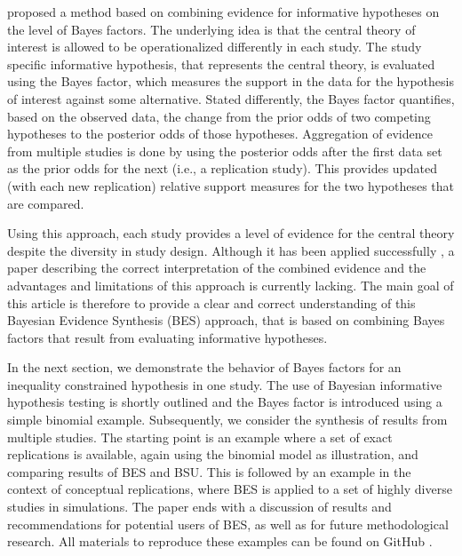 \documentclass[11pt,reqno]{article}
\begin{document}
\citet{kuiper_combining_2013} proposed a method based on combining evidence for informative hypotheses on the level of Bayes factors. The underlying idea is that the central theory of interest is allowed to be operationalized differently in each study. The study specific informative hypothesis, that represents the central theory, is evaluated using the Bayes factor, which measures the support in the data for the hypothesis of interest against some alternative. Stated differently, the Bayes factor quantifies, based on the observed data, the change from the prior odds of two competing hypotheses to the posterior odds of those hypotheses. Aggregation of evidence from multiple studies is done by using the posterior odds after the first data set as the prior odds for the next (i.e., a replication study). This provides updated (with each new replication) relative support measures for the two hypotheses that are compared.

Using this approach, each study provides a level of evidence for the central theory despite the diversity in study design. Although it has been applied successfully \citep{zondervan_parental_2019, zondervan_robust_2020, kevenaar_bes_2021, volker_cooperation_2022}, a paper describing the correct interpretation of the combined evidence and the advantages and limitations of this approach is currently lacking. The main goal of this article is therefore to provide a clear and correct understanding of this Bayesian Evidence Synthesis (BES) approach, that is based on combining Bayes factors that result from evaluating informative hypotheses.

In the next section, we demonstrate the behavior of Bayes factors for an inequality constrained hypothesis in one study. The use of Bayesian informative hypothesis testing is shortly outlined and the Bayes factor is introduced using a simple binomial example. Subsequently, we consider the synthesis of results from multiple studies. The starting point is an example where a set of exact replications is available, again using the binomial model as illustration, and comparing results of BES and BSU. This is followed by an example in the context of conceptual replications, where BES is applied to a set of highly diverse studies in simulations. The paper ends with a discussion of results and recommendations for potential users of BES, as well as for future methodological research. All materials to reproduce these examples can be found on GitHub \citep[][https://github.com/thomvolker/bes-intro-paper]{klugkist_bes_materials}.
\end{document}
